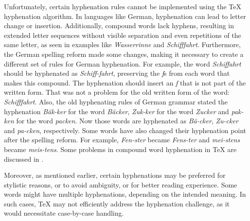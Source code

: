 \documentclass{article}
\begin{document}
Unfortunately, certain hyphenation rules cannot be implemented using the \TeX{}
hyphenation algorithm. In languages like German, hyphenation can lead to letter
change or insertion. Additionally, compound words lack hyphens, resulting in
extended letter sequences without visible separation and even repetitions of
the same letter, as seen in examples like \emph{Wasserrinne} and
\emph{Schifffahrt}.  Furthermore, the German spelling reform made some changes,
making it necessary to create a different set of rules for German hyphenation.
For example, the word \emph{Schiffahrt} should be hyphenated as
\emph{Schiff-fahrt}, preserving the \emph{f}s from each word that makes this
compound. The hyphenation should insert an \emph{f} that is not part of the
written form. That was not a problem for the old written form of the word:
\emph{Schifffahrt}. Also, the old hyphenating rules of German grammar stated
the hyphenation \emph{Bäk-ker} for the word \emph{Bäcker}, \emph{Zuk-ker} for
the word \emph{Zucker} and \emph{pak-ken} for the word \emph{packen}. Now those
words are hyphenated as \emph{Bä-cker}, \emph{Zu-cker} and \emph{pa-cken},
respectively. Some words have also changed their hyphenation point after the
spelling reform. For example, \emph{Fen-ster} became \emph{Fens-ter} and
\emph{mei-stens} became \emph{meis-tens}. Some problems in compound word
hyphenation in \TeX{} are discussed in \textcite{sojka1995a}.










Moreover, as mentioned earlier, certain hyphenations may be preferred for
stylistic reasons, or to avoid ambiguity, or for better reading experience.
Some words might have multiple hyphenations, depending on the intended meaning.
In such cases, \TeX{} may not efficiently address the hyphenation challenge, as
it would necessitate case-by-case handling.
\end{document}
